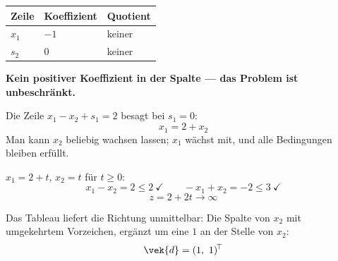 \begin{aufgabe}
\begin{center}
\renewcommand{\arraystretch}{1.48}
\begin{tabular}{@{}P{2.0cm}P{2.4cm}P{2.8cm}@{}}
\toprule
\textbf{Zeile} & \textbf{Koeffizient} & \textbf{Quotient}\\
\midrule
$x_1$ & $-1$ & \textcolor{akzent}{keiner}\\
$s_2$ & $0$ & \textcolor{akzent}{keiner}\\
\bottomrule
\end{tabular}
\end{center}

\begin{center}
\begin{minipage}{0.9\textwidth}
\textbf{Kein positiver Koeffizient in der Spalte --- das Problem ist unbeschränkt.}
\end{minipage}
\end{center}

Die Zeile $x_1 - x_2 + s_1 = 2$ besagt bei $s_1=0$:
\[ x_1 = 2 + x_2 \]
Man kann $x_2$ beliebig wachsen lassen; $x_1$ wächst mit, und alle Bedingungen bleiben erfüllt.

 $x_1 = 2+t$, $x_2 = t$ für $t \ge 0$:
\[ x_1-x_2 = 2 \le 2 \ \checkmark \qquad -x_1+x_2 = -2 \le 3 \ \checkmark \]
\[ z = 2+2t \to \infty \]

Das Tableau liefert die Richtung unmittelbar: Die Spalte von $x_2$ mit umgekehrtem Vorzeichen, ergänzt um eine $1$ an der Stelle von $x_2$:
\[ \vek{d} = (1,\ 1)^{\!\top} \]

\begin{center}
\begin{minipage}{0.86\textwidth}
\end{minipage}
\end{center}
\end{aufgabe}

